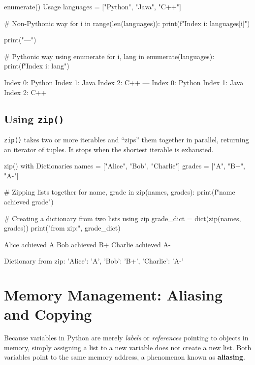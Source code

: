 \begin{pythoncode}[]{enumerate() Usage}
languages = ["Python", "Java", "C++"]

# Non-Pythonic way
for i in range(len(languages)):
    print(f"Index {i}: {languages[i]}")

print("---")

# Pythonic way using enumerate
for i, lang in enumerate(languages):
    print(f"Index {i}: {lang}")
\end{pythoncode}

\begin{outputbox}
Index 0: Python
Index 1: Java
Index 2: C++
---
Index 0: Python
Index 1: Java
Index 2: C++
\end{outputbox}

\subsection{Using \texttt{zip()}}
\texttt{zip()} takes two or more iterables and ``zips'' them together in parallel, returning an iterator of tuples. It stops when the shortest iterable is exhausted.

\begin{pythoncode}[]{zip() with Dictionaries}
names = ["Alice", "Bob", "Charlie"]
grades = ["A", "B+", "A-"]

# Zipping lists together
for name, grade in zip(names, grades):
    print(f"{name} achieved {grade}")

# Creating a dictionary from two lists using zip
grade_dict = dict(zip(names, grades))
print("\nDictionary from zip:", grade_dict)
\end{pythoncode}

\begin{outputbox}
Alice achieved A
Bob achieved B+
Charlie achieved A-

Dictionary from zip: {'Alice': 'A', 'Bob': 'B+', 'Charlie': 'A-'}
\end{outputbox}

\section{Memory Management: Aliasing and Copying}

Because variables in Python are merely \textit{labels} or \textit{references} pointing to objects in memory, simply assigning a list to a new variable does not create a new list. Both variables point to the same memory address, a phenomenon known as \textbf{aliasing}.

